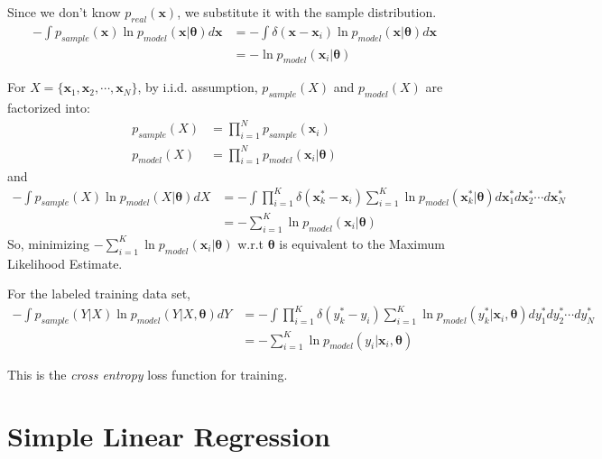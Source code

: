 \documentclass[a4]{article}
\begin{document}
Since we don't know $p_{real}(\bm{x})$, we substitute it with the
sample distribution.
\begin{equation}
\begin{aligned}
-\int p_{sample}(\bm{x}) \ln p_{model}(\bm{x}|\bm{\theta}) d\bm{x}
&= 
-\int \delta(\bm{x}-\bm{x}_i)\ln p_{model}(\bm{x}|\bm{\theta}) d\bm{x}\\
&= -\ln p_{model}(\bm{x}_i|\bm{\theta})
\end{aligned}
\end{equation}

For $X= \{\bm{x}_1, \bm{x}_2, \cdots, \bm{x}_N\}$, by i.i.d. assumption,
$p_{sample}(X)$ and $p_{model}(X)$ are factorized into:
\begin{equation}
\begin{aligned}
p_{sample}(X) &= \prod_{i=1}^N p_{sample}(\bm{x}_i)\\
p_{model}(X)  &= \prod_{i=1}^N p_{model}(\bm{x}_i|\bm{\theta})
\end{aligned}
\end{equation}
and
\begin{equation}
\begin{aligned}
- \int p_{sample}(X) \ln p_{model}(X|\bm{\theta}) dX
&= 
-\int \prod_{i=1}^K \delta(\bm{x}^*_k -\bm{x}_i)
\sum_{i=1}^K \ln p_{model}(\bm{x}^*_k|\bm{\theta})
d\bm{x}^*_1d\bm{x}^*_2\cdots d\bm{x}^*_N\\
&= -\sum_{i=1}^K \ln p_{model}(\bm{x}_i|\bm{\theta})
\end{aligned}
\end{equation}
So, minimizing $-\sum_{i=1}^K \ln p_{model}(\bm{x}_i|\bm{\theta})$ w.r.t 
$\bm{\theta}$ is equivalent to the Maximum Likelihood Estimate.

For the labeled training data set, 
\begin{equation}
\begin{aligned}
- \int p_{sample}(Y|X) \ln p_{model}( Y | X,\bm{\theta} ) dY
&= 
-\int \prod_{i=1}^K \delta(y^*_k - y_i)
\sum_{i=1}^K \ln p_{model}(y^*_k | \bm{x}_i, \bm{\theta})
dy^*_1dy^*_2\cdots dy^*_N\\
&= -\sum_{i=1}^K \ln p_{model}(y_i|\bm{x}_i, \bm{\theta})
\end{aligned}
\end{equation}

This is the \emph{cross entropy} loss function for training.

\section{Simple Linear Regression}
\end{document}
